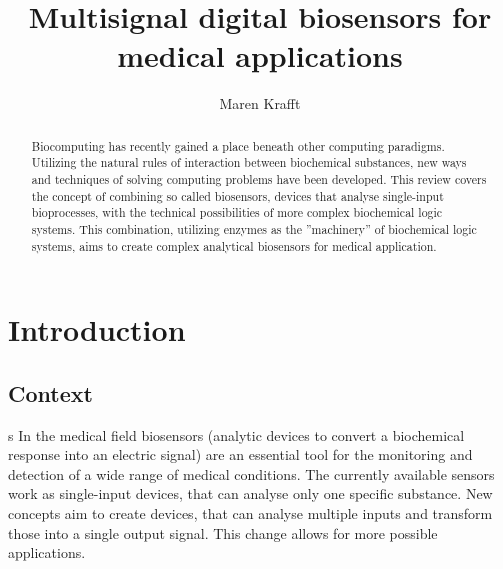 \documentclass[runningheads]{llncs}
\begin{document}
\title{Multisignal digital biosensors for medical applications}
\author{Maren Krafft}
\maketitle        

      
\begin{abstract}
Biocomputing has recently gained a place beneath other computing paradigms. Utilizing the natural rules of interaction between biochemical substances, new ways and techniques of solving computing problems have been developed. This review covers the concept of combining so called biosensors, devices that analyse single-input bioprocesses, with the technical possibilities of more complex biochemical logic systems. This combination, utilizing enzymes as the ''machinery'' of biochemical logic systems, aims to create complex analytical biosensors for medical application.



\end{abstract}


\section{Introduction}

\subsection{Context}
s
	In the medical field biosensors (analytic devices to convert a biochemical response into an electric signal) are an essential tool for the monitoring and detection of a wide range of medical conditions. The currently available sensors work as single-input devices, that can analyse only one specific substance. New concepts aim to create devices, that can analyse multiple inputs and transform those into a single output signal. This change allows for more possible applications.\\
	
\end{document}
